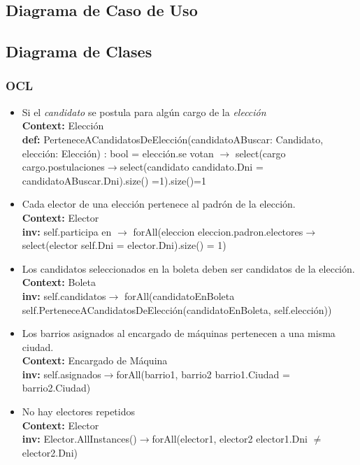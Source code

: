 \documentclass[spanish, 10pt,a4paper]{article}
\numberwithin{equation}{section} %
\begin{document}
\subsection{Diagrama de Caso de Uso}

\subsection{Diagrama de Clases}
\subsubsection{OCL}
\begin{itemize}
	\item Si el \textit{candidato} se postula para algún cargo de la \textit{elección}
\\	\textbf{Context: }  Elección
\\	\textbf{def: }PerteneceACandidatosDeElección(candidatoABuscar: Candidato, elección: Elección) : bool = elección.se votan $\rightarrow$ select(cargo \textbar cargo.postulaciones$\rightarrow$select(candidato \textbar candidato.Dni = candidatoABuscar.Dni).size() =1).size()=1

	\item Cada elector de una elección pertenece al padrón de la elección.
\\	\textbf{Context: }  Elector
\\	\textbf{inv: }self.participa en $\rightarrow$ forAll(eleccion \textbar eleccion.padron.electores$\rightarrow$select(elector \textbar self.Dni = elector.Dni).size() = 1)

	\item Los candidatos seleccionados en la boleta deben ser candidatos de la elección.
\\	\textbf{Context: }  Boleta
\\	\textbf{inv: }self.candidatos$\rightarrow$ forAll(candidatoEnBoleta \textbar self.PerteneceACandidatosDeElección(candidatoEnBoleta, self.elección))

	\item Los barrios asignados al encargado de máquinas pertenecen a una misma ciudad.
\\	\textbf{Context: }  Encargado de Máquina
\\	\textbf{inv: } self.asignados$\rightarrow$forAll(barrio1, barrio2 \textbar barrio1.Ciudad = barrio2.Ciudad)

	\item No hay electores repetidos
\\	\textbf{Context: }  Elector
\\	\textbf{inv: } Elector.AllInstances()$\rightarrow$forAll(elector1, elector2 \textbar elector1.Dni $\neq$ elector2.Dni)


\end{itemize}
\end{document}
